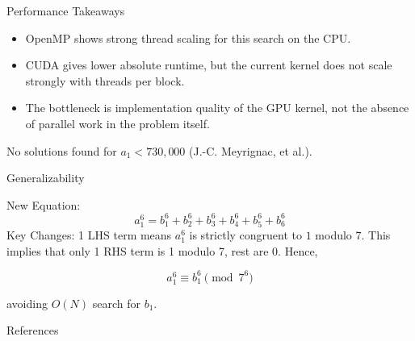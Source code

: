 \documentclass[]{beamer}
\begin{document}
\begin{frame}{Performance Takeaways}
  \begin{itemize}
    \item OpenMP shows strong thread scaling for this search on the CPU.
    \item CUDA gives lower absolute runtime, but the current kernel does not scale strongly with threads per block.
    \item The bottleneck is implementation quality of the GPU kernel, not the absence of parallel work in the problem itself.
  \end{itemize}

  \bigskip
  No solutions found for $a_1<730{,}000$ (J.-C. Meyrignac, et al.).
\end{frame}

\begin{frame}{Generalizability}

  New Equation:
  \begin{equation*}
    a_1^6 = b_1^6 + b_2^6 + b_3^6 + b_4^6 + b_5^6 +b^6_6
  \end{equation*}
  \pause
  Key Changes: 1 LHS term means $a_1^6$ is strictly congruent to $1$ modulo $7$. \pause This implies that only 1 RHS term is 1 modulo 7, rest are 0. Hence,

  $$a_1^6\equiv b_1^6 \pmod{7^6}$$

  avoiding $O(N)$ search for $b_1$.
\end{frame}

\begin{frame}{References}
  \nocite{*}
  
  
\end{frame}
\end{document}
